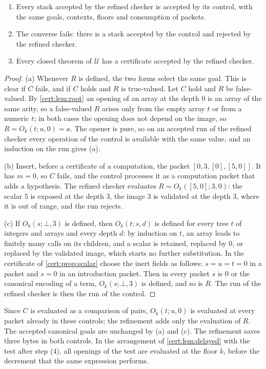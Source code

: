 \begin{theorem}\label{cert:thm:eager-selection}
\begin{enumerate}[label=(\alph*)]
\item Every stack accepted by the refined checker is accepted by its control,
with the same goals, contexts, floors and consumption of packets.
\item The converse fails: there is a stack accepted by the control and
rejected by the refined checker.
\item Every closed theorem of $\mathcal U$ has a certificate accepted by the
refined checker.
\end{enumerate}
\end{theorem}
\begin{proof}
(a) Whenever $R$ is defined, the two forms select the same goal. This is clear
if $C$ fails, and if $C$ holds and $R$ is true-valued. Let $C$ hold and $R$ be
false-valued. By \cref{cert:lem:root} an opening of an array at the depth $0$
is an array of the same arity, so a false-valued $R$ arises only from the
empty array $t$ or from a numeric $t$; in both cases the opening does not
depend on the image, so $R=O_k(t;u,0)=a$. The opener is pure, so on an
accepted run of the refined checker every operation of the control is
available with the same value, and an induction on the run gives (a).

(b) Insert, before a certificate of a computation, the packet
$[0,3,[0],[5,0]]$. It has $m=0$, so $C$ fails, and the control processes it as
a computation packet that adds a hypothesis. The refined checker evaluates
$R=O_k([5,0];3,0)$: the scalar $5$ is exposed at the depth $3$, the image $3$
is validated at the depth $3$, where it is out of range, and the run rejects.

(c) If $O_k(s;\bot,3)$ is defined, then $O_k(t;s,d)$ is defined for every tree
$t$ of integers and arrays and every depth $d$: by induction on $t$, an array
leads to finitely many calls on its children, and a scalar is retained,
replaced by $0$, or replaced by the validated image, which starts no further
substitution. In the certificate of \cref{cert:prop:scalar} choose the inert
fields as follows: $s=u=t=0$ in a  packet and $s=0$ in an
introduction packet. Then in every packet $s$ is $0$ or the canonical encoding
of a term, $O_k(s;\bot,3)$ is defined, and so is $R$. The run of the refined
checker is then the run of the control.
\end{proof}

Since $C$ is evaluated as a comparison of pairs, $O_k(t;u,0)$ is evaluated at
every packet already in these controls; the refinement adds only the
evaluation of $R$. The accepted canonical goals are unchanged by (a) and (c).
The refinement saves three bytes in both controls. In the arrangement of
\cref{cert:lem:delayed} with the test after step (4), all openings of the test
are evaluated at the floor $k$, before the decrement that the same expression
performs.

